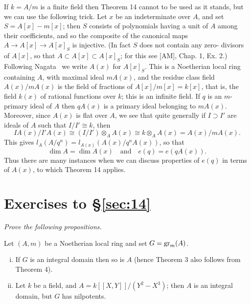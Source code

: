 If $k = A/m$ is a finite field then Theorem 14 cannot to be used as it
stands, but we can use the following trick. Let $x$ be an indeterminate over
$A$, and set $S = A[x] - m[x]$; then $S$ consists of polynomials having a unit
of $A$ among their coefficients, and so the composite of the canonical maps
$A \to A[x] \to A[x]_S$ is injective. (In fact $S$ does not contain any zero-
divisors of $A[x]$, so that $A \subset A[x] \subset A[x]_S$; for this see [AM], Chap. 1,
Ex. 2.) Following Nagata~\cite{N1} we write $A(x)$ for $A[x]_S$. This is a
Noetherian local ring containing $A$, with maximal ideal $mA(x)$, and the
residue class field $A(x)/mA(x)$ is the field of fractions of $A[x]/m[x] = k[x]$,
that is, the field $k(x)$ of rational functions over $k$; this is an infinite field.
If $q$ is an $m$-primary ideal of $A$ then $qA(x)$ is a primary ideal belonging
to $mA(x)$. Moreover, since $A(x)$ is flat over $A$, we see that quite generally
if $I \supset I'$ are ideals of $A$ such that $I/I' \cong k$, then
\[
  IA(x)/I'A(x) \cong (I/I') \otimes_A A(x) \cong k \otimes_A A(x) = A(x)/mA(x).
\]
This gives $l_A(A/q^n) = l_{A(x)}(A(x)/q^nA(x))$, so that
\[
  \dim A = \dim A(x) \quad \text{and} \quad e(q) = e(qA(x)).
\]
Thus there are many instances when we can discuss properties of
$e(q)$ in terms of $A(x)$, to which Theorem 14 applies.

\section*{Exercises to \S\ref{sec:14}}
\emph{Prove the following propositions.}

\begin{exercise}\label{ex:14.1-ex}
Let $(A, m)$ be a Noetherian local ring and set $G = \operatorname{gr}_m(A)$.
\begin{enumerate}[(i)]
  \item If $G$ is an integral domain then so is $A$ (hence Theorem 3 also follows
        from Theorem 4).
  \item Let $k$ be a field, and $A = k[[X, Y]]/(Y^2 - X^3)$; then $A$ is an integral
        domain, but $G$ has nilpotents.
\end{enumerate}
\end{exercise}

